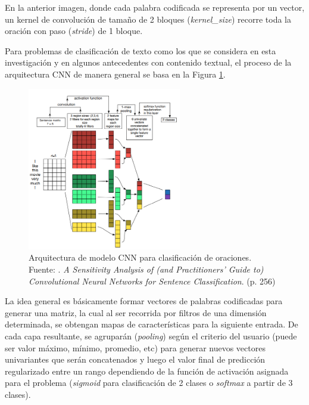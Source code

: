 \begin{itemize}
	En la anterior imagen, donde cada palabra codificada se representa por un vector, un kernel de convolución de tamaño de 2 bloques (\textit{kernel\_size}) recorre toda la oración con paso (\textit{stride}) de 1 bloque.
	
	Para problemas de clasificación de texto como los que se considera en esta investigación y en algunos antecedentes con contenido textual, el proceso de la arquitectura CNN de manera general se basa en la Figura \ref{2:fig42}.
	\begin{figure}[!ht]
		\begin{center}
			\includegraphics[width=0.60\textwidth]{2/figures/cnn_steps_for_nlp.png}
			\caption[Arquitectura de modelo CNN para clasificación de oraciones]{Arquitectura de modelo CNN para clasificación de oraciones.\\
			Fuente: \cite{tec_zhang2017cnn_sentenceclassification}. \textit{A Sensitivity Analysis of (and Practitioners’ Guide to) Convolutional Neural Networks for Sentence Classification}. (p. 256)}
			\label{2:fig42}
		\end{center}
	\end{figure}
	
	La idea general es básicamente formar vectores de palabras codificadas para generar una matriz, la cual al ser recorrida por filtros de una dimensión determinada, se obtengan mapas de características para la siguiente entrada. De cada capa resultante, se agruparán (\textit{pooling}) según el criterio del usuario (puede ser valor máximo, mínimo, promedio, etc) para generar nuevos vectores univariantes que serán concatenados y luego el valor final de predicción regularizado entre un rango dependiendo de la función de activación asignada para el problema (\textit{sigmoid} para clasificación de 2 clases o \textit{softmax} a partir de 3 clases). 
	

\end{itemize}
